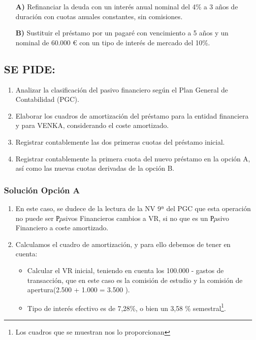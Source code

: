 \begin{itemize}
    \item[\textbf{A)}] Refinanciar la deuda con un interés anual nominal del 4\% a 3 años de duración con cuotas anuales constantes, sin comisiones.
    \item[\textbf{B)}] Sustituir el préstamo por un pagaré con vencimiento a 5 años y un nominal de 60.000 € con un tipo de interés de mercado del 10\%.
\end{itemize}

\subsection*{SE PIDE:}

\begin{enumerate}
    \item Analizar la clasificación del pasivo financiero según el Plan General de Contabilidad (PGC).
    \item Elaborar los cuadros de amortización del préstamo para la entidad financiera y para VENKA, considerando el coste amortizado.
    \item Registrar contablemente las dos primeras cuotas del préstamo inicial.
    \item Registrar contablemente la primera cuota del nuevo préstamo en la opción A, así como las nuevas cuotas derivadas de la opción B.
\end{enumerate}

\subsubsection*{Solución Opción A}

\begin{enumerate}
    \item En este caso, se dudece de la lectura de la NV 9ª del PGC que esta operación no puede ser \c{Pasivos Financieros cambios a VR}, si no que es un \c{Pasivo Financiero a coste amortizado}.
    \item Calculamos el cuadro de amortización, y para ello debemos de tener en cuenta:
    \begin{itemize}
        \item Calcular el VR inicial, teniendo en cuenta los 100.000 \e - gastos de transacción, que en este caso es la comisión de estudio y la comisión de apertura(2.500 + 1.000 = 3.500 \e).
        \item Tipo de interés efectivo es de 7,28\%, o bien un 3,58 \% semestral\footnote{Los cuadros que se muestran nos lo proporcionan}.
    \end{itemize}
\end{enumerate}

